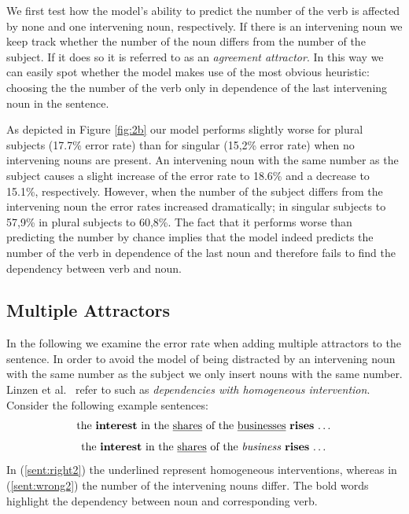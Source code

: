 \documentclass[11pt,a4paper]{article}
\begin{document}
We first test how the model's ability to predict the number of the verb is affected by none and one intervening noun, respectively. If there is an intervening noun we keep track whether the number of the noun differs from the number of the subject. If it does so it is referred to as an \textit{agreement attractor}. In this way we can easily spot whether the model makes use of the most obvious heuristic: choosing the the number of the verb only in dependence of the last intervening noun in the sentence.

As depicted in Figure \ref{fig:2b} our model performs slightly worse for plural subjects (17.7\% error rate) than for singular (15,2\% error rate) when no intervening nouns are present. An intervening noun with the same number as the subject causes a slight increase of the error rate to 18.6\% and a decrease to 15.1\%, respectively. However, when the number of the subject differs from the intervening noun the error rates increased dramatically; in singular subjects to 57,9\% in plural subjects to 60,8\%. The fact that it performs worse than predicting the number by chance implies that the model indeed predicts the number of the verb in dependence of the last noun and therefore fails to find the dependency between verb and noun.

\subsection{Multiple Attractors}

In the following we examine the error rate when adding multiple attractors to the sentence. In order to avoid the model of being distracted by an intervening noun with the same number as the subject we only insert nouns with the same number. Linzen et al.~\citep{Linzen2016} refer to such as  \textit{ dependencies with homogeneous intervention}. Consider the following example sentences:
\begin{equation}
	\label{sent:right2}
	\textnormal{the \textbf{interest} in the \underline{shares} of the \underline{businesses} \textbf{rises} \dots}
\end{equation}
\begin{equation}
	\label{sent:wrong2}
	\textnormal{the \textbf{interest} in the \underline{shares} of the \textit{business} \textbf{rises} \dots}
\end{equation}
In (\ref{sent:right2}) the underlined represent homogeneous interventions, whereas in (\ref{sent:wrong2}) the number of the intervening nouns differ. The bold words highlight the dependency between noun and corresponding verb.
\end{document}
